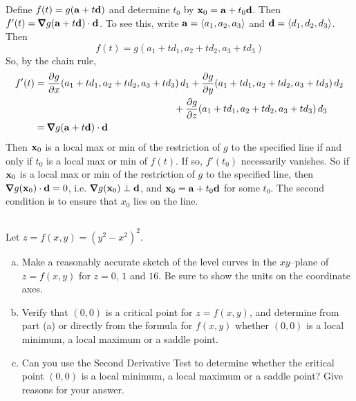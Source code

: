 \begin{solution}
 Define $f(t)=g(\mathbf{a}+t\mathbf{d})$ and determine $t_0$ by 
$\mathbf{x}_0=\mathbf{a}+t_0\mathbf{d}$. Then $f'(t)=\vnabla g(\va+t\vd)\cdot\vd$. 
To see this, write $\mathbf{a}=\left< a_1,a_2,a_3\right>$ and $\mathbf{d}=\left< d_1,d_2,d_3\right>$.
Then 
\begin{equation*}
f(t)=g(a_1+td_1,a_2+td_2,a_3+td_3)
\end{equation*} 
So, by the chain rule,
\begin{align*}
f'(t) &= \pdiff{g}{x}(a_1+td_1,a_2+td_2,a_3+td_3)\,d_1
       +\pdiff{g}{y}(a_1+td_1,a_2+td_2,a_3+td_3)\,d_2 \\&\hskip2in
       +\pdiff{g}{z}(a_1+td_1,a_2+td_2,a_3+td_3)\,d_3 \\
     &=\vnabla g(\va+t\vd)\cdot\vd
\end{align*}
Then $\mathbf{x}_0$ is a local
max or min of the restriction of $g$  to the specified line if and only
if $t_0$ is a local max or min of $f(t)$. If so, $f'(t_0)$  necessarily
vanishes. So if $\mathbf{x}_0$ is a local
max or min of the restriction of $g$  to the specified line,
then $\vnabla g(\vx_0)\cdot\vd=0$, i.e. $\vnabla g(\vx_0)\perp\vd$, and $\mathbf{x}_0=\mathbf{a}+t_0\mathbf{d}$ for some $t_0$. 
The second condition is to ensure that $x_0$ lies on the line.
\end{solution}




\subsection*{\Procedural}

\begin{question}[M200 2005D] %
Let $z = f(x,y) = {(y^2 - x^2)}^2$.
\begin{enumerate}[(a)]
\item
Make a reasonably accurate sketch of the level curves in the $xy$--plane 
of $z = f(x,y)$ for $z = 0$, $1$ and $16$. Be sure to show the units 
on the coordinate axes.
\item
Verify that $(0,0)$ is a critical point for $z = f(x,y)$, and 
determine from part (a) or directly from the formula for $f(x,y)$ 
whether $(0, 0)$ is a local minimum, a local maximum or a saddle point.
\item
Can you use the Second Derivative Test to determine whether the 
critical point $(0, 0)$ is a local minimum, a local maximum or 
a saddle point? Give reasons for your answer.
\end{enumerate}

\end{question}

